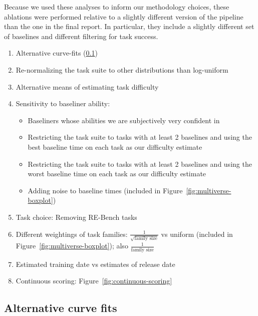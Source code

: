 \documentclass{article}
\begin{document}
Because we used these analyses to inform our methodology choices, these ablations were performed relative to a slightly different version of the pipeline than the one in the final report. In particular, they include a slightly different set of baselines and different filtering for task success.
\begin{enumerate}

\item Alternative curve-fits (\ref{app:alternative-curve-fits})

\item Re-normalizing the task suite to other distributions than log-uniform %
\item Alternative means of estimating task difficulty
\item Sensitivity to baseliner ability:
\begin{itemize}
    \item Baseliners whose abilities we are subjectively very confident in
    \item Restricting the task suite to tasks with at least 2 baselines and using the best baseline time on each task as our difficulty estimate
    \item Restricting the task suite to tasks with at least 2 baselines and using the worst baseline time on each task as our difficulty estimate 
    \item Adding noise to baseline times (included in Figure~\ref{fig:multiverse-boxplot})
\end{itemize}
\item Task choice: Removing RE-Bench tasks

\item Different weightings of task families: $\frac{1}{\sqrt{\text{family size}}}$ vs uniform (included in Figure~\ref{fig:multiverse-boxplot}); also $\frac{1}{\text{family size}}$
\item Estimated training date vs estimates of release date %

\item Continuous scoring: Figure~\ref{fig:continuous-scoring}
\end{enumerate}

\subsection{Alternative curve fits} \label{app:alternative-curve-fits}
\end{document}
